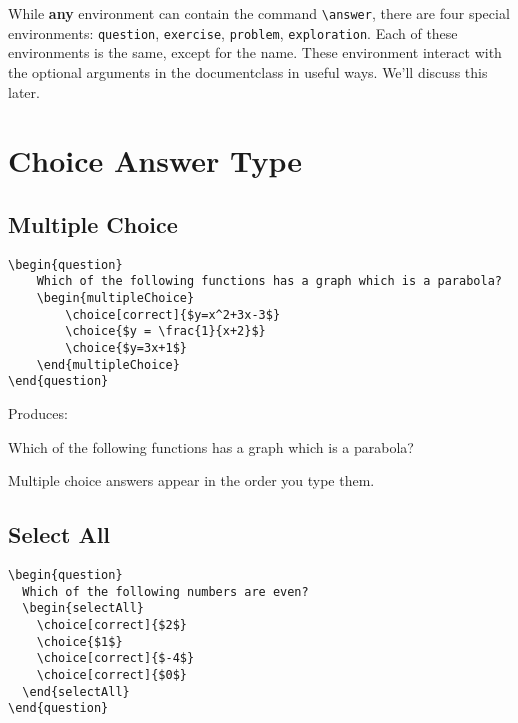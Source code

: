 \documentclass{ximera}
\begin{document}
 
While \textbf{any} environment can contain the command \verb|\answer|,
there are four special environments: \verb|question|, \verb|exercise|,
\verb|problem|, \verb|exploration|. Each of these environments is the
same, except for the name. These environment interact with the
optional arguments in the documentclass in useful ways. We'll discuss
this later.
 
 
 
 
 
\section{Choice Answer Type}
 
\subsection{Multiple Choice}
 
\begin{verbatim}
\begin{question}
    Which of the following functions has a graph which is a parabola?
    \begin{multipleChoice}
        \choice[correct]{$y=x^2+3x-3$}
        \choice{$y = \frac{1}{x+2}$}
        \choice{$y=3x+1$}
    \end{multipleChoice}
\end{question}
\end{verbatim}
 
Produces:
 
\begin{question}
  Which of the following functions has a graph which is a parabola?
  \begin{multipleChoice}
  \end{multipleChoice}
\end{question}
 
\begin{remark}
  Multiple choice answers appear in the order you type them.
\end{remark}
 
 
\subsection{Select All}
 
\begin{verbatim}
\begin{question}
  Which of the following numbers are even?
  \begin{selectAll}
    \choice[correct]{$2$}
    \choice{$1$}
    \choice[correct]{$-4$}
    \choice[correct]{$0$}
  \end{selectAll}
\end{question}
\end{verbatim}
 
\end{document}
